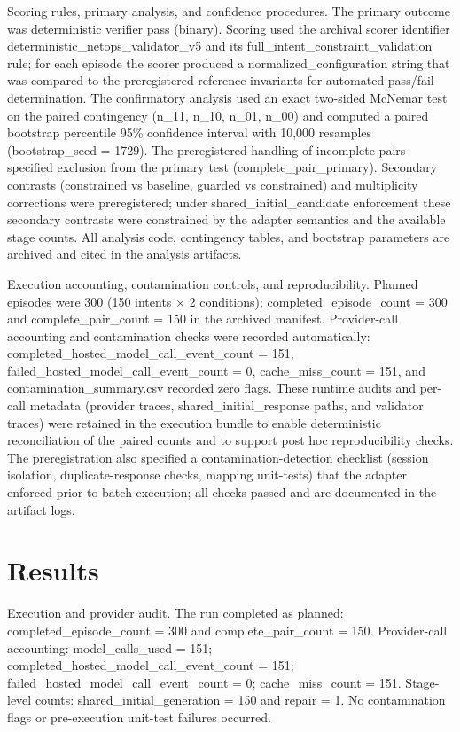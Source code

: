 \documentclass[conference]{IEEEtran}
\begin{document}
Scoring rules, primary analysis, and confidence procedures. The primary outcome was deterministic verifier pass (binary). Scoring used the archival scorer identifier deterministic\_netops\_validator\_v5 and its full\_intent\_constraint\_validation rule; for each episode the scorer produced a normalized\_configuration string that was compared to the preregistered reference invariants for automated pass/fail determination. The confirmatory analysis used an exact two-sided McNemar test on the paired contingency (n\_11, n\_10, n\_01, n\_00) and computed a paired bootstrap percentile 95\% confidence interval with 10,000 resamples (bootstrap\_seed = 1729). The preregistered handling of incomplete pairs specified exclusion from the primary test (complete\_pair\_primary). Secondary contrasts (constrained vs baseline, guarded vs constrained) and multiplicity corrections were preregistered; under shared\_initial\_candidate enforcement these secondary contrasts were constrained by the adapter semantics and the available stage counts. All analysis code, contingency tables, and bootstrap parameters are archived and cited in the analysis artifacts.

Execution accounting, contamination controls, and reproducibility. Planned episodes were 300 (150 intents \ensuremath{\times} 2 conditions); completed\_episode\_count = 300 and complete\_pair\_count = 150 in the archived manifest. Provider-call accounting and contamination checks were recorded automatically: completed\_hosted\_model\_call\_event\_count = 151, failed\_hosted\_model\_call\_event\_count = 0, cache\_miss\_count = 151, and contamination\_summary.csv recorded zero flags. These runtime audits and per-call metadata (provider traces, shared\_initial\_response paths, and validator traces) were retained in the execution bundle to enable deterministic reconciliation of the paired counts and to support post hoc reproducibility checks. The preregistration also specified a contamination-detection checklist (session isolation, duplicate-response checks, mapping unit-tests) that the adapter enforced prior to batch execution; all checks passed and are documented in the artifact logs.

\section{Results}
Execution and provider audit. The run completed as planned: completed\_episode\_count = 300 and complete\_pair\_count = 150. Provider-call accounting: model\_calls\_used = 151; completed\_hosted\_model\_call\_event\_count = 151; failed\_hosted\_model\_call\_event\_count = 0; cache\_miss\_count = 151. Stage-level counts: shared\_initial\_generation = 150 and repair = 1. No contamination flags or pre-execution unit-test failures occurred.
\end{document}
